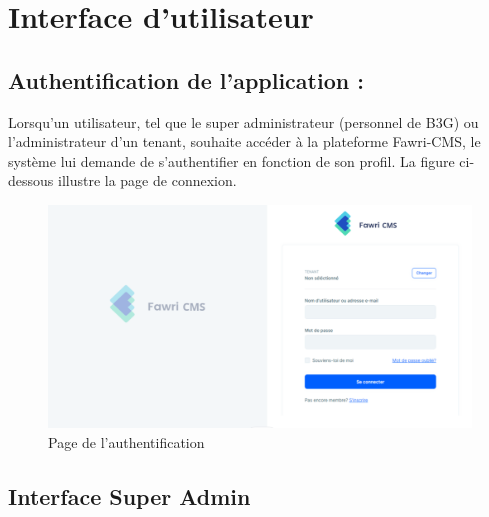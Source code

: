 
\section{Interface d’utilisateur}

\subsection{Authentification de l’application :}

\hspace{\parindent}Lorsqu'un utilisateur, tel que le super administrateur (personnel de B3G) ou l'administrateur d'un tenant, souhaite accéder à la plateforme Fawri-CMS, le système lui demande de s'authentifier en fonction de son profil. La figure ci-dessous illustre la page de connexion.


\begin{figure}[H] 
    \centering
    \includegraphics[width=18cm]{Figures/full loging page.PNG}
    \caption{Page de l'authentification}
\end{figure}


\subsection{Interface Super Admin}

